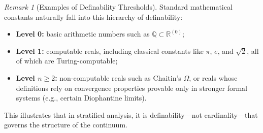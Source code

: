 \documentclass[12pt]{article}
\theoremstyle{definition}
\theoremstyle{plain}
\theoremstyle{remark}
\newtheorem*{remark}{Remark}
\begin{document}
\begin{remark}[Examples of Definability Thresholds]
Standard mathematical constants naturally fall into this hierarchy of definability:
\begin{itemize}
    \item \textbf{Level 0:} basic arithmetic numbers such as \( \mathbb{Q} \subset \mathbb{R}^{(0)} \);
    \item \textbf{Level 1:} computable reals, including classical constants like \( \pi \), \( e \), and \( \sqrt{2} \), all of which are Turing-computable;
    \item \textbf{Level \( n \geq 2 \):} non-computable reals such as Chaitin’s \( \Omega \), or reals whose definitions rely on convergence properties provable only in stronger formal systems (e.g., certain Diophantine limits).
\end{itemize}
This illustrates that in stratified analysis, it is definability—not cardinality—that governs the structure of the continuum.
\end{remark}
\end{document}
